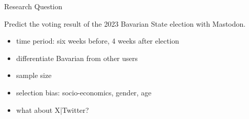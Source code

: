 
\begin{frame}{Research Question}
	
	Predict the voting result of the 2023 Bavarian State election with Mastodon.
	
	\begin{itemize}
		\item time period: six weeks before, 4 weeks after election
		\item differentiate Bavarian from other users
		\item sample size
		\item selection bias: socio-economics, gender, age
		\item what about X|Twitter?
	\end{itemize}
\end{frame}

